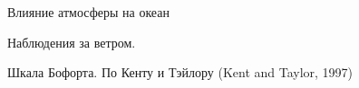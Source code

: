 \begin{chapter}{Влияние атмосферы на океан}
\begin{section}{Наблюдения за ветром.}
\begin{paragraph}{Шкала Бофорта.}
По Кенту и Тэйлору (Kent and Taylor, 1997)
%

\end{paragraph}
\end{section}
\end{chapter}

